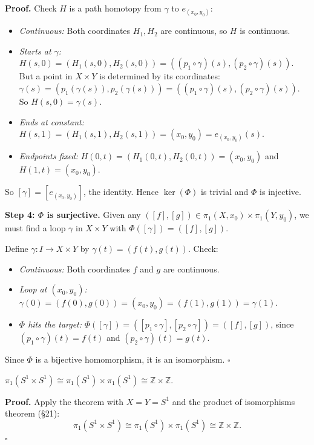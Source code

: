 \documentclass[11pt]{report}
\renewenvironment{proof}[1][Proof]{\noindent\textbf{#1.} }{\hfill$\square$\par\vspace{5pt}}
\begin{document}
\begin{proof}
Check $H$ is a path homotopy from $\gamma$ to $e_{(x_0,y_0)}$:
\begin{itemize}[nosep]
    \item \textit{Continuous:} Both coordinates $H_1, H_2$ are continuous, so $H$ is continuous.
    \item \textit{Starts at $\gamma$:} $H(s, 0) = (H_1(s,0), H_2(s,0)) = ((p_1 \circ \gamma)(s), (p_2 \circ \gamma)(s))$. But a point in $X \times Y$ is determined by its coordinates: $\gamma(s) = (p_1(\gamma(s)), p_2(\gamma(s))) = ((p_1 \circ \gamma)(s), (p_2 \circ \gamma)(s))$. So $H(s,0) = \gamma(s)$. \checkmark
    \item \textit{Ends at constant:} $H(s, 1) = (H_1(s,1), H_2(s,1)) = (x_0, y_0) = e_{(x_0,y_0)}(s)$. \checkmark
    \item \textit{Endpoints fixed:} $H(0, t) = (H_1(0,t), H_2(0,t)) = (x_0, y_0)$ and $H(1, t) = (x_0, y_0)$. \checkmark
\end{itemize}
So $[\gamma] = [e_{(x_0,y_0)}]$, the identity. Hence $\ker(\Phi)$ is trivial and $\Phi$ is injective.

\textbf{Step 4: $\Phi$ is surjective.} Given any $([f], [g]) \in \pi_1(X, x_0) \times \pi_1(Y, y_0)$, we must find a loop $\gamma$ in $X \times Y$ with $\Phi([\gamma]) = ([f], [g])$.

Define $\gamma: I \to X \times Y$ by $\gamma(t) = (f(t), g(t))$. Check:
\begin{itemize}[nosep]
    \item \textit{Continuous:} Both coordinates $f$ and $g$ are continuous.
    \item \textit{Loop at $(x_0, y_0)$:} $\gamma(0) = (f(0), g(0)) = (x_0, y_0) = (f(1), g(1)) = \gamma(1)$.
    \item \textit{$\Phi$ hits the target:} $\Phi([\gamma]) = ([p_1 \circ \gamma], [p_2 \circ \gamma]) = ([f], [g])$, since $(p_1 \circ \gamma)(t) = f(t)$ and $(p_2 \circ \gamma)(t) = g(t)$.
\end{itemize}

Since $\Phi$ is a bijective homomorphism, it is an isomorphism.
\end{proof}

\begin{corbox}
$\pi_1(S^1 \times S^1) \cong \pi_1(S^1) \times \pi_1(S^1) \cong \mathbb{Z} \times \mathbb{Z}$.
\end{corbox}

\begin{proof}
Apply the theorem with $X = Y = S^1$ and the product of isomorphisms theorem (\S 21):
\[\pi_1(S^1 \times S^1) \cong \pi_1(S^1) \times \pi_1(S^1) \cong \mathbb{Z} \times \mathbb{Z}.\]
\end{proof}
\end{document}
